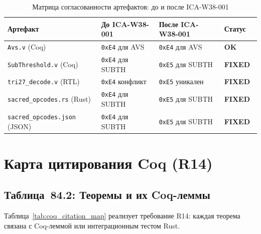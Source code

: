 \begin{table}[ht]
\centering
\caption{Матрица согласованности артефактов: до и после ICA-W38-001}
\label{tab:consistency_matrix}
\begin{tabular}{llll}
\hline
Артефакт & До ICA-W38-001 & После ICA-W38-001 & Статус \\
\hline
\texttt{Avs.v} (Coq) & \texttt{0xE4} для AVS & \texttt{0xE4} для AVS & \textbf{OK} \\
\texttt{SubThreshold.v} (Coq) & \texttt{0xE4} для SUBTH & \texttt{0xE5} для SUBTH & \textbf{FIXED}~\cite{pr661_t27} \\
\texttt{tri27\_decode.v} (RTL) & \texttt{0xE4} конфликт & \texttt{0xE5} уникален & \textbf{FIXED}~\cite{pr_trinity_fpga_134} \\
\texttt{sacred\_opcodes.rs} (Rust) & \texttt{0xE4} для SUBTH & \texttt{0xE5} для SUBTH & \textbf{FIXED}~\cite{pr_tt25,pr_tt26} \\
\texttt{sacred\_opcodes.json} (JSON) & \texttt{0xE4} для SUBTH & \texttt{0xE5} для SUBTH & \textbf{FIXED}~\cite{pr_trios_871,pr_trios_874,pr_trios_875,pr_trios_877} \\
\hline
\end{tabular}
\end{table}

\section{Карта цитирования Coq (R14)}
\label{sec:coq_citation_map}


\subsection{Таблица~84.2: Теоремы и их Coq-леммы}

Таблица~\ref{tab:coq_citation_map} реализует требование R14:
каждая теорема связана с Coq-леммой или интеграционным тестом Rust.

